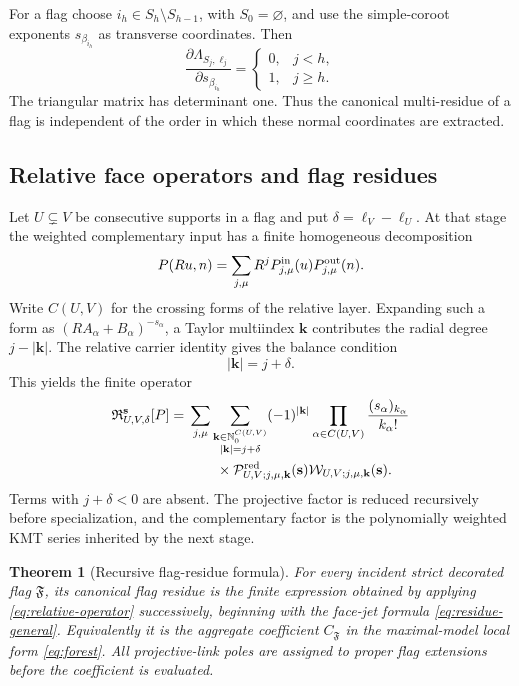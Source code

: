 \documentclass[11pt]{article}
\newtheorem{theorem}{Theorem}[section]
\newcommand{\Nzero}{\mathbb N_0}
\newcommand{\cP}{\mathcal P}
\newcommand{\cW}{\mathcal W}
\begin{document}
For a flag choose \(i_h\in S_h\setminus S_{h-1}\), with
\(S_0=\varnothing\), and use the simple-coroot exponents
\(s_{\beta_{i_h}}\) as transverse coordinates.  Then
\[
 \frac{\partial\Lambda_{S_j,\ell_j}}
      {\partial s_{\beta_{i_h}}}
 =\begin{cases}0,&j<h,\\1,&j\ge h.
 \end{cases}
\]
The triangular matrix has determinant one.  Thus the canonical
multi-residue of a flag is independent of the order in which these
normal coordinates are extracted.

\subsection{Relative face operators and flag residues}

Let \(U\subsetneq V\) be consecutive supports in a flag and put
\(\delta=\ell_V-\ell_U\).  At that stage the weighted complementary
input has a finite homogeneous decomposition
\[
 P(Ru,n)=\sum_{j,\mu}R^j
 P^{\rm in}_{j,\mu}(u)P^{\rm out}_{j,\mu}(n).
\]
Write \(C(U,V)\) for the crossing forms of the relative layer.  Expanding
such a form as \((RA_\alpha+B_\alpha)^{-s_\alpha}\), a Taylor
multiindex \(\mathbf k\) contributes the radial degree
\(j-|\mathbf k|\).  The relative carrier identity gives the balance
condition
\[
 |\mathbf k|=j+\delta.
\]
This yields the finite operator
\begin{equation}\label{eq:relative-operator}
\begin{aligned}
 \mathfrak R_{U,V,\delta}^{\mathbf s}[P]
 ={}&\sum_{j,\mu}
 \sum_{\substack{\mathbf k\in\Nzero^{C(U,V)}\\
                  |\mathbf k|=j+\delta}}
 (-1)^{|\mathbf k|}
 \prod_{\alpha\in C(U,V)}
 \frac{(s_\alpha)_{k_\alpha}}{k_\alpha!}\\
 &\qquad\times
 \cP^{\rm red}_{U,V;j,\mu,\mathbf k}(\mathbf s)
 \cW_{U,V;j,\mu,\mathbf k}(\mathbf s).
\end{aligned}
\end{equation}
Terms with \(j+\delta<0\) are absent.  The projective factor is reduced
recursively before specialization, and the complementary factor is the
polynomially weighted KMT series inherited by the next stage.

\begin{theorem}[Recursive flag-residue formula]
\label{thm:flag-residue}
For every incident strict decorated flag \(\mathfrak F\), its canonical
flag residue is the finite expression obtained by applying
\eqref{eq:relative-operator} successively, beginning with the face-jet
formula \eqref{eq:residue-general}.  Equivalently it is the aggregate
coefficient \(C_{\mathfrak F}\) in the maximal-model local form
\eqref{eq:forest}.  All projective-link poles are assigned to proper
flag extensions before the coefficient is evaluated.
\end{theorem}
\end{document}
